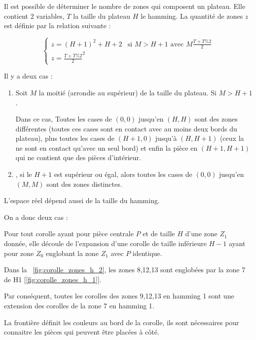 	
	Il est possible de déterminer le nombre de zones qui composent un plateau. Elle contient 2 variables, $T$ la taille du plateau $H$ le hamming. La quantité de zones $z$ est définie par la relation suivante :
	
	\[
		\begin{cases}
		z=(H+1)^2 + H+2 &\text{si } M > H+1  \text{ avec } M\frac{T + T\%2}{2}\\
		z= \frac{T + T\%2}{2}^2&
		\end{cases}	
	\]
	
	Il y a deux cas :
	
	\begin{enumerate}
		\item Soit  $M$ la moitié (arrondie au supérieur) de la taille du plateau. Si $M> H+1$.
		
		Dans ce cas, Toutes les cases de $(0,0)$ jusqu'en $(H,H)$ sont des zones différentes (toutes ces cases sont en contact avec au moins deux bords du plateau), plus toutes les cases de $(H+1,0)$ jusqu'à $(H,H+1)$ (ceux la ne sont en contact qu'avec un seul bord) et enfin la pièce en $(H+1,H+1)$ qui ne contient que des pièces d'intérieur.
		
		\item, si le $H+1$ est supérieur ou égal, alors toutes les cases de $(0,0)$ jusqu'en $(M,M)$ sont des zones distinctes.
	\end{enumerate}
	
	
	L'espace réel dépend aussi de la taille du hamming.
	
	On a donc deux cas : 
	
	\begin{defn}
	Pour tout corolle ayant pour pièce centrale $P$ et de taille $H$ d'une zone $Z_1$ donnée, elle découle de l'expansion d'une corolle de
	taille inférieure $H-1$ ayant pour zone $Z_0$ englobant la zone $Z_1$ avec $P$ identique.
	\end{defn}
	\begin{exmp}
		Dans la ~\autoref{fig:corolle_zones_h_2}, les zones 8,12,13 sont englobées par la zone 7 de H1 [\autoref{fig:corolle_zones_h_1}].
		
		Par conséquent, toutes les corolles des zones 9,12,13 en hamming 1 sont une extension des corolles de la zone 7 en hamming 1.
	\end{exmp}

	La frontière définit les couleurs au bord de la corolle, ils sont nécessaires pour connaitre les pièces qui peuvent être placées à côté.
	
